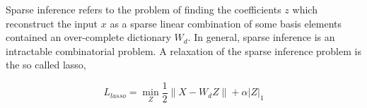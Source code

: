 Sparse inference refers to the problem of finding the coefficients $z$ which
reconstruct the input $x$ as a sparse linear combination of some basis elements
contained an over-complete dictionary $W_d$. In general, sparse inference is an 
intractable combinatorial problem. A relaxation of the sparse inference problem is
the so called lasso, 

\begin{equation}
L_{lasso} = \min_Z \frac{1}{2}\|X-W_dZ\| + \alpha |Z|_1 
\end{equation} 

